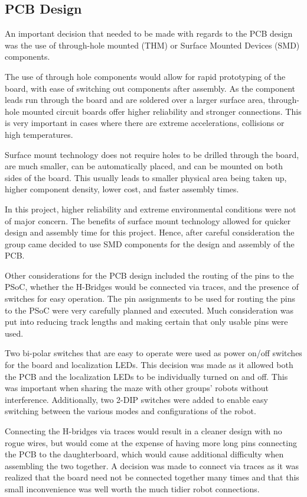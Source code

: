 \documentclass{article}
\begin{document}
\subsection{PCB Design}

An important decision that needed to be made with regards to the PCB design was the use of through-hole mounted (THM) or Surface Mounted Devices (SMD) components.

The use of through hole components would allow for rapid prototyping of the board, with ease of switching out components after assembly. As the component leads run through the board and are soldered over a larger surface area, through-hole mounted circuit boards offer higher reliability and stronger connections. This is very important in cases where there are extreme accelerations, collisions or high temperatures.

Surface mount technology does not require holes to be drilled through the board, are much smaller, can be automatically placed, and can be mounted on both sides of the board. This usually leads to smaller physical area being taken up, higher component density, lower cost, and faster assembly times. 

In this project, higher reliability and extreme environmental conditions were not of major concern. The benefits of surface mount technology allowed for quicker design and assembly time for this project. Hence, after careful consideration the group came decided to use SMD components for the design and assembly of the PCB.

Other considerations for the PCB design included the routing of the pins to the PSoC, whether the H-Bridges would be connected via traces, and the presence of switches for easy operation. The pin assignments to be used for routing the pins to the PSoC were very carefully planned and executed. Much consideration was put into reducing track lengths and making certain that only usable pins were used.

Two bi-polar switches that are easy to operate were used as power on/off switches for the board and localization LEDs. This decision was made as it allowed both the PCB and the localization LEDs to be individually turned on and off. This was important when sharing the maze with other groups' robots without interference. Additionally, two 2-DIP switches were added to enable easy switching between the various modes and configurations of the robot.

Connecting the H-bridges via traces would result in a cleaner design with no rogue wires, but would come at the expense of having more long pins connecting the PCB to the daughterboard, which would cause additional difficulty when assembling the two together. A decision was made to connect via traces as it was realized that the board need not be connected together many times and that this small inconvenience was well worth the much tidier robot connections.
\end{document}
